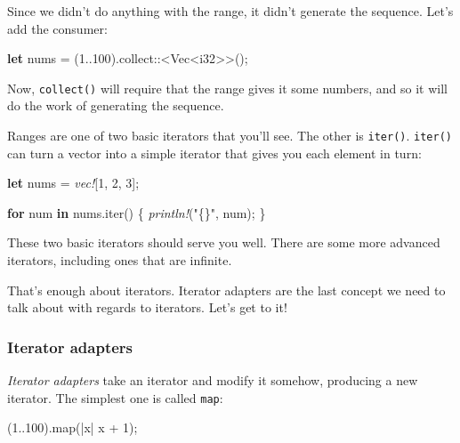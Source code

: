 \documentclass[a4paper,]{book}
\newenvironment{Shaded}{\begin{snugshade}}{\end{snugshade}}
\newcommand{\KeywordTok}[1]{\textcolor[rgb]{0.13,0.29,0.53}{\textbf{{#1}}}}
\newcommand{\DataTypeTok}[1]{\textcolor[rgb]{0.13,0.29,0.53}{{#1}}}
\newcommand{\DecValTok}[1]{\textcolor[rgb]{0.00,0.00,0.81}{{#1}}}
\newcommand{\StringTok}[1]{\textcolor[rgb]{0.31,0.60,0.02}{{#1}}}
\newcommand{\PreprocessorTok}[1]{\textcolor[rgb]{0.56,0.35,0.01}{\textit{{#1}}}}
\newcommand{\NormalTok}[1]{{#1}}
\begin{document}
Since we didn't do anything with the range, it didn't generate the
sequence. Let's add the consumer:

\begin{Shaded}
\begin{Highlighting}[]
\KeywordTok{let} \NormalTok{nums = (}\DecValTok{1.}\NormalTok{.}\DecValTok{100}\NormalTok{).collect::<}\DataTypeTok{Vec}\NormalTok{<}\DataTypeTok{i32}\NormalTok{>>();}
\end{Highlighting}
\end{Shaded}

Now, \texttt{collect()} will require that the range gives it some
numbers, and so it will do the work of generating the sequence.

Ranges are one of two basic iterators that you'll see. The other is
\texttt{iter()}. \texttt{iter()} can turn a vector into a simple
iterator that gives you each element in turn:

\begin{Shaded}
\begin{Highlighting}[]
\KeywordTok{let} \NormalTok{nums = }\PreprocessorTok{vec!}\NormalTok{[}\DecValTok{1}\NormalTok{, }\DecValTok{2}\NormalTok{, }\DecValTok{3}\NormalTok{];}

\KeywordTok{for} \NormalTok{num }\KeywordTok{in} \NormalTok{nums.iter() \{}
   \PreprocessorTok{println!}\NormalTok{(}\StringTok{"\{\}"}\NormalTok{, num);}
\NormalTok{\}}
\end{Highlighting}
\end{Shaded}

These two basic iterators should serve you well. There are some more
advanced iterators, including ones that are infinite.

That's enough about iterators. Iterator adapters are the last concept we
need to talk about with regards to iterators. Let's get to it!

\subsubsection{Iterator adapters}\label{iterator-adapters}

\emph{Iterator adapters} take an iterator and modify it somehow,
producing a new iterator. The simplest one is called \texttt{map}:

\begin{Shaded}
\begin{Highlighting}[]
\NormalTok{(}\DecValTok{1.}\NormalTok{.}\DecValTok{100}\NormalTok{).map(|x| x + }\DecValTok{1}\NormalTok{);}
\end{Highlighting}
\end{Shaded}
\end{document}
